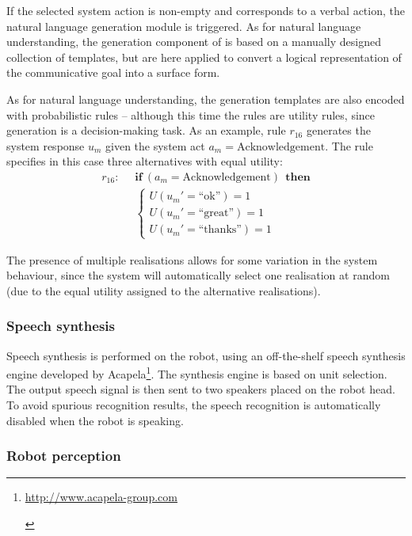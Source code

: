 If the selected system action is non-empty and corresponds to a verbal action, the natural language generation module is triggered.  As for natural language understanding, the generation component of \opendial is based on a manually designed collection of templates, but are here applied to convert a logical representation of the communicative goal into a surface form. 

As for natural language understanding, the generation templates are also encoded with probabilistic rules -- although this time the rules are utility rules, since generation is a decision-making task.  As an example, rule $r_{16}$ generates the system response $u_m$ given the system act $a_m=\mathrm{Acknowledgement}$.  The rule specifies in this case three alternatives with equal utility:
\begin{align*}
r_{16}: &\;\;\textbf{if} \ (a_m = \mathrm{Acknowledgement} )  \ \ \textbf{then} \\ 
& \;\; \begin{cases} U(u_m'=\text{``ok''}) = 1 \\ U(u_m'=\text{``great''}) = 1 \\ U(u_m'=\text{``thanks''}) = 1 \end{cases}
\end{align*}

The presence of multiple realisations allows for some variation in the system behaviour, since the system will automatically select one realisation at random (due to the equal utility assigned to the alternative realisations).

\subsubsection*{Speech synthesis}

Speech synthesis is performed on the robot, using an off-the-shelf speech synthesis engine developed by Acapela\footnote{\begin{scriptsize}\url{http://www.acapela-group.com}\end{scriptsize}}. The synthesis engine is based on unit selection. The output speech signal is then sent to two speakers placed on the robot head. To avoid spurious recognition results, the speech recognition is automatically disabled when the robot is speaking.   
 
\subsubsection*{Robot perception}

